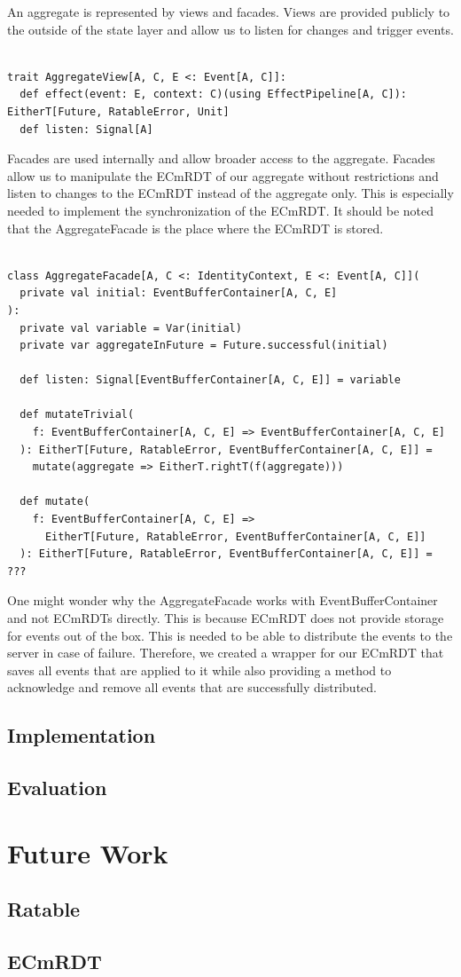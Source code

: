 \documentclass[
	ngerman,
	ruledheaders=section,   %
	class=report,		    %
	thesis={type=bachelor}, %
	accentcolor=9c,			%
	custommargins=false,    %
	marginpar=false,        %
	parskip=half-,          %
	fontsize=11pt,          %
]{tudapub}
\begin{document}
An aggregate is represented by views and facades. Views are provided publicly to the outside of the state layer and allow us to listen for changes and trigger events. 

\begin{lstlisting}

trait AggregateView[A, C, E <: Event[A, C]]:
  def effect(event: E, context: C)(using EffectPipeline[A, C]): EitherT[Future, RatableError, Unit]
  def listen: Signal[A]

\end{lstlisting}

Facades are used internally and allow broader access to the aggregate. Facades allow us to manipulate the ECmRDT of our aggregate without restrictions and listen to changes to the ECmRDT instead of the aggregate only. This is especially needed to implement the synchronization of the ECmRDT. It should be noted that the AggregateFacade is the place where the ECmRDT is stored.

\begin{lstlisting}

class AggregateFacade[A, C <: IdentityContext, E <: Event[A, C]](
  private val initial: EventBufferContainer[A, C, E]
):
  private val variable = Var(initial)
  private var aggregateInFuture = Future.successful(initial)

  def listen: Signal[EventBufferContainer[A, C, E]] = variable

  def mutateTrivial(
    f: EventBufferContainer[A, C, E] => EventBufferContainer[A, C, E]
  ): EitherT[Future, RatableError, EventBufferContainer[A, C, E]] =
    mutate(aggregate => EitherT.rightT(f(aggregate)))

  def mutate(
    f: EventBufferContainer[A, C, E] => 
      EitherT[Future, RatableError, EventBufferContainer[A, C, E]]
  ): EitherT[Future, RatableError, EventBufferContainer[A, C, E]] = ???

\end{lstlisting}

One might wonder why the AggregateFacade works with EventBufferContainer and not ECmRDTs directly. This is because ECmRDT does not provide storage for events out of the box. This is needed to be able to distribute the events to the server in case of failure. Therefore, we created a wrapper for our ECmRDT that saves all events that are applied to it while also providing a method to acknowledge and remove all events that are successfully distributed. 

\section{Implementation}
\section{Evaluation}

\chapter{Future Work}
\section{Ratable}
\section{ECmRDT}

\printbibliography
\end{document}

